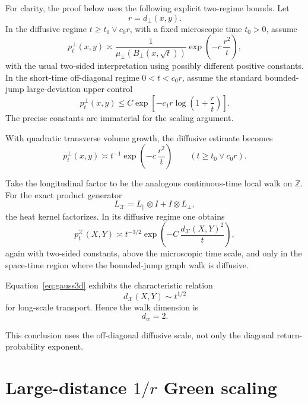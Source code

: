 \documentclass[11pt]{article}
\newcommand{\Z}{\mathbb{Z}}
\newcommand{\cX}{\mathcal{X}}
\begin{document}
For clarity, the proof below uses the following explicit two-regime bounds. Let
\[
r=d_\perp(x,y).
\]
In the diffusive regime \(t\ge t_0\vee c_0 r\), with a fixed microscopic time \(t_0>0\), assume
\begin{equation}
p_t^\perp(x,y)
\asymp
\frac{1}{\mu_\perp(B_\perp(x,\sqrt t))}
\exp\!\left(
-c\,\frac{r^2}{t}
\right),
\label{eq:gaussperp}
\end{equation}
with the usual two-sided interpretation using possibly different positive constants. In the short-time off-diagonal regime \(0<t<c_0r\), assume the standard bounded-jump large-deviation upper control
\begin{equation}
p_t^\perp(x,y)
\le
C
\exp\!\left[
-c_1 r\log\!\left(1+\frac{r}{t}\right)
\right].
\label{eq:shorttail}
\end{equation}
The precise constants are immaterial for the scaling argument.

With quadratic transverse volume growth, the diffusive estimate becomes
\begin{equation}
p_t^\perp(x,y)
\asymp
t^{-1}
\exp\!\left(
-c\,\frac{r^2}{t}
\right)
\qquad (t\ge t_0\vee c_0r).
\end{equation}

Take the longitudinal factor to be the analogous continuous-time local walk on \(\Z\). For the exact product generator
\begin{equation}
L_{\cX}
=
L_\parallel\otimes I
+
I\otimes L_\perp,
\label{eq:productgenerator}
\end{equation}
the heat kernel factorizes. In its diffusive regime one obtains
\begin{equation}
p_t^{\cX}(X,Y)
\asymp
t^{-3/2}
\exp\!\left(
-C\,\frac{d_{\cX}(X,Y)^2}{t}
\right),
\label{eq:gauss3d}
\end{equation}
again with two-sided constants, above the microscopic time scale, and only in the space-time region where the bounded-jump graph walk is diffusive.

Equation~\eqref{eq:gauss3d} exhibits the characteristic relation
\[
d_{\cX}(X,Y)\sim t^{1/2}
\]
for long-scale transport. Hence the walk dimension is
\begin{equation}
\boxed{d_w=2.}
\label{eq:dw2}
\end{equation}

This conclusion uses the off-diagonal diffusive scale, not only the diagonal return-probability exponent.

\section{Large-distance \(1/r\) Green scaling}
\end{document}
